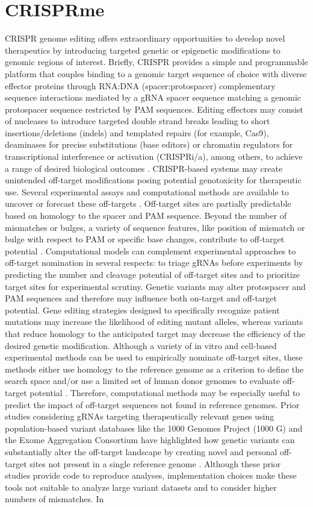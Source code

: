 \documentclass[a4paper, titlepage, openright]{book}
\newcommand{\mychapter}[2]{
    \setcounter{chapter}{#1}
    \setcounter{section}{0}
    \chapter*{#2}
    \addcontentsline{toc}{chapter}{#2}
}
\begin{document}
\mychapter{9}{CRISPRme}
CRISPR genome editing offers extraordinary opportunities to develop novel therapeutics by introducing targeted genetic or epigenetic modifications to genomic regions of interest. Briefly, CRISPR provides a simple and programmable platform that couples binding to a genomic target sequence of choice with diverse effector proteins through RNA:DNA (spacer:protospacer) complementary sequence interactions mediated by a gRNA spacer sequence matching a genomic protospacer sequence restricted by PAM sequences. Editing effectors may consist of nucleases to introduce targeted double strand breaks leading to short insertions/deletions (indels) and templated repairs (for example, Cas9), deaminases for precise substitutions (base editors) or chromatin regulators for transcriptional interference or activation (CRISPRi/a), among others, to achieve a range of desired biological outcomes \citep{anzalone2020genome}. CRISPR-based systems may create unintended off-target modifications posing potential genotoxicity for therapeutic use. Several experimental assays and computational methods are available to uncover or forecast these off-targets \citep{clement2020technologies}. Off-target sites are partially predictable based on homology to the spacer and PAM sequence. Beyond the number of mismatches or bulges, a variety of sequence features, like position of mismatch or bulge with respect to PAM or specific base changes, contribute to off-target potential \citep{clement2020technologies, bao2021tools, hsu2013dna, doench2016optimized}. Computational models can complement experimental approaches to off-target nomination in several respects: to triage gRNAs before experiments by predicting the number and cleavage potential of off-target sites and to prioritize target sites for experimental scrutiny. Genetic variants may alter protospacer and PAM sequences and therefore may influence both on-target and off-target potential. Gene editing strategies designed to specifically recognize patient mutations may increase the likelihood of editing mutant alleles, whereas variants that reduce homology to the anticipated target may decrease the efficiency of the desired genetic modification. Although a variety of in vitro and cell-based experimental methods can be used to empirically nominate off-target sites, these methods either use homology to the reference genome as a criterion to define the search space and/or use a limited set of human donor genomes to evaluate off-target potential \citep{bao2021tools, chaudhari2020evaluation}. Therefore, computational methods may be especially useful to predict the impact of off-target sequences not found in reference genomes. Prior studies considering gRNAs targeting therapeutically relevant genes using population-based variant databases like the 1000 Genomes Project (1000 G) and the Exome Aggregation Consortium have highlighted how genetic variants can substantially alter the off-target landscape by creating novel and personal off-target sites not present in a single reference genome \citep{lessard2017human, scott2017implications}. Although these prior studies provide code to reproduce analyses, implementation choices make these tools not suitable to analyze large variant datasets and to consider higher numbers of mismatches. In 
\end{document}
